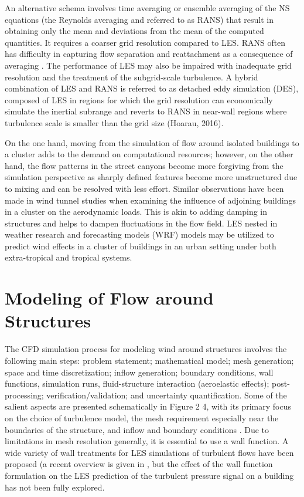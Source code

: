 An alternative schema involves time averaging or ensemble averaging of the NS equations (the Reynolds averaging and referred to as RANS) that result in obtaining only the mean and deviations from the mean of the computed quantities. It requires a coarser grid resolution compared to LES. RANS often has difficulty in capturing flow separation and reattachment as a consequence of averaging \citep{spalart2010reflections}. The performance of LES may also be impaired with inadequate grid resolution and the treatment of the subgrid-scale turbulence. A hybrid combination of LES and RANS is referred to as detached eddy simulation (DES), composed of LES in regions for which the grid resolution can economically simulate the inertial subrange and reverts to RANS in near-wall regions where turbulence scale is smaller than the grid size (Hoarau, 2016).

On the one hand, moving from the simulation of flow around isolated buildings to a cluster adds to the demand on computational resources; however, on the other hand, the flow patterns in the street canyons become more forgiving from the simulation perspective as sharply defined features become more unstructured due to mixing and can be resolved with less effort. Similar observations have been made in wind tunnel studies when examining the influence of adjoining buildings in a cluster on the aerodynamic loads. This is akin to adding damping in structures and helps to dampen fluctuations in the flow field. LES nested in weather research and forecasting models (WRF) models may be utilized to predict wind effects in a cluster of buildings in an urban setting under both extra-tropical and tropical systems. 

\section{Modeling of Flow around Structures}
\label{sec:resp_cfd_wind_flow_modeling}

The CFD simulation process for modeling wind around structures involves the following main steps: problem statement; mathematical model; mesh generation; space and time discretization; inflow generation; boundary conditions, wall functions, simulation runs, fluid-structure interaction (aeroelastic effects); post-processing; verification/validation; and uncertainty quantification. Some of the salient aspects are presented schematically in Figure 2 4, with its primary focus on the choice of turbulence model, the mesh requirement especially near the boundaries of the structure, and inflow and boundary conditions \citep{ferziger2012computational}. Due to limitations in mesh resolution generally, it is essential to use a wall function. A wide variety of wall treatments for LES simulations of turbulent flows have been proposed (a recent overview is given in \citep{bose2018wall}, but the effect of the wall function formulation on the LES prediction of the turbulent pressure signal on a building has not been fully explored. 

